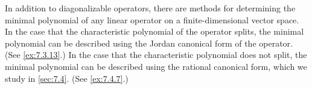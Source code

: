 \begin{note}
  In addition to diagonalizable operators, there are methods for determining the minimal polynomial of any linear operator on a finite-dimensional vector space.
  In the case that the characteristic polynomial of the operator splits, the minimal polynomial can be described using the Jordan canonical form of the operator.
  (See \cref{ex:7.3.13}.)
  In the case that the characteristic polynomial does not split, the minimal polynomial can be described using the rational canonical form, which we study in \cref{sec:7.4}.
  (See \cref{ex:7.4.7}.)
\end{note}

\exercisesection

\begin{ex}\label{ex:7.3.13}

\end{ex}
